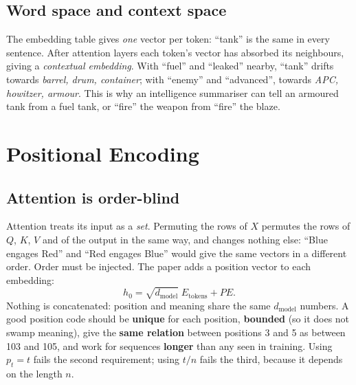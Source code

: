 \documentclass[11pt]{article}
\begin{document}
\subsection{Word space and context space}
The embedding table gives \emph{one} vector per token: ``tank'' is the same in every sentence. After attention layers each token's vector has absorbed its neighbours, giving a \emph{contextual embedding}. With ``fuel'' and ``leaked'' nearby, ``tank'' drifts towards \emph{barrel, drum, container}; with ``enemy'' and ``advanced'', towards \emph{APC, howitzer, armour}. This is why an intelligence summariser can tell an armoured tank from a fuel tank, or ``fire'' the weapon from ``fire'' the blaze.

\section{Positional Encoding}\label{sec:pe}
\subsection{Attention is order-blind}
Attention treats its input as a \emph{set}. Permuting the rows of $X$ permutes the rows of $Q$, $K$, $V$ and of the output in the same way, and changes nothing else: ``Blue engages Red'' and ``Red engages Blue'' would give the same vectors in a different order. Order must be injected. The paper adds a position vector to each embedding:
\[h_0=\sqrt{d_{\text{model}}}\;E_{\text{tokens}}+PE.\]
Nothing is concatenated: position and meaning share the same $d_{\text{model}}$ numbers. A good position code should be \textbf{unique} for each position, \textbf{bounded} (so it does not swamp meaning), give the \textbf{same relation} between positions 3 and 5 as between 103 and 105, and work for sequences \textbf{longer} than any seen in training. Using $p_t=t$ fails the second requirement; using $t/n$ fails the third, because it depends on the length $n$.
\end{document}
